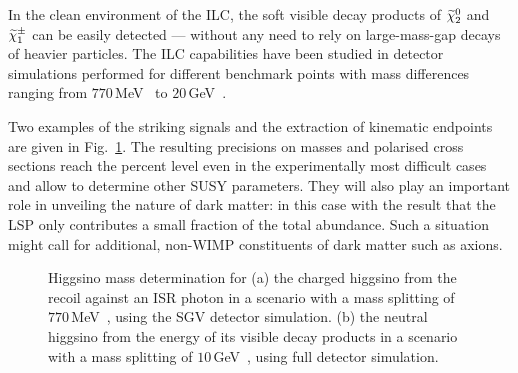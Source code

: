 In the clean environment of the ILC, the soft visible
decay products of $\mbox{$ \widetilde{\chi}^0_2 $}$ and $\mbox{$ \widetilde{\chi}^{\pm}_1 $}$ can be easily detected 
--- without any need to rely on large-mass-gap decays
of heavier particles. 
The ILC capabilities 
have been studied in detector simulations performed for different 
benchmark points with mass 
differences ranging from $770$\,MeV~\cite{Berggren:2013vfa}
to $20$\,GeV~\cite{Baer:2016new}. 

Two examples of the striking signals and the extraction of 
kinematic endpoints are given in Fig.~\ref{fig:searches_higgsinos}. 
The resulting precisions on masses and polarised 
cross sections reach the percent level even in the experimentally most difficult 
cases and allow to determine other SUSY parameters.
They will also play an important role in unveiling the nature of dark matter: 
in this case with the result that the LSP only contributes a small fraction of the 
total abundance. Such a situation might call for additional, non-WIMP constituents of 
dark matter such as axions.
\begin{figure}[]
  \begin{center}
    \hspace{0.05\linewidth}
  \end{center}
  \caption{\label{fig:searches_higgsinos} Higgsino mass determination for (a) the charged higgsino from the recoil against an ISR photon in a scenario with a mass splitting of $770$\,MeV~\cite{Berggren:2013vfa}, using the SGV detector 
simulation. (b) the neutral higgsino from the energy of its visible decay products in a scenario with a mass splitting of  $10$\,GeV~\cite{Baer:2016new}, using full detector simulation.}
\end{figure}
